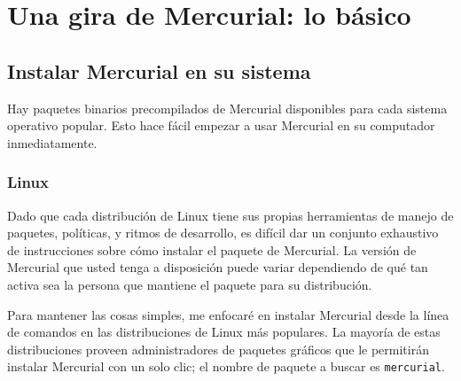 \chapter{Una gira de Mercurial: lo básico}
\label{chap:tour-basic}

\section{Instalar Mercurial en su sistema}
\label{sec:tour:install}
Hay paquetes binarios precompilados de Mercurial disponibles para cada
sistema operativo popular. Esto hace fácil empezar a usar Mercurial
en su computador inmediatamente.

\subsection{Linux}

Dado que cada distribución de Linux tiene sus propias herramientas de
manejo de paquetes, políticas, y ritmos de desarrollo, es difícil dar
un conjunto exhaustivo de instrucciones sobre cómo instalar el paquete
de Mercurial. La versión de Mercurial que usted tenga a disposición
puede variar dependiendo de qué tan activa sea la persona que mantiene
el paquete para su distribución.

Para mantener las cosas simples, me enfocaré en instalar Mercurial
desde la línea de comandos en las distribuciones de Linux más
populares. La mayoría de estas distribuciones proveen administradores
de paquetes gráficos que le permitirán instalar Mercurial con un solo
clic; el nombre de paquete a buscar es \texttt{mercurial}.

